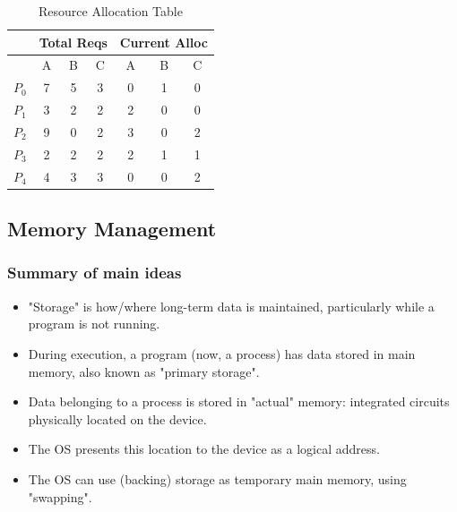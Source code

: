 \documentclass[a4paper, 10pt]{article}
\begin{document}
\begin{table}[h!]
    \centering
    \begin{tabular}{c|ccc|ccc}
        \hline
        \multicolumn{1}{c}{} & \multicolumn{3}{c|}{\textbf{Total Reqs}} & \multicolumn{3}{c}{\textbf{Current Alloc}}                 \\
        \hline
                             & A                                        & B                                          & C & A & B & C \\
        \hline
        $P_0$                & 7                                        & 5                                          & 3 & 0 & 1 & 0 \\
        $P_1$                & 3                                        & 2                                          & 2 & 2 & 0 & 0 \\
        $P_2$                & 9                                        & 0                                          & 2 & 3 & 0 & 2 \\
        $P_3$                & 2                                        & 2                                          & 2 & 2 & 1 & 1 \\
        $P_4$                & 4                                        & 3                                          & 3 & 0 & 0 & 2 \\
        \hline
    \end{tabular}
    \caption{Resource Allocation Table}
    \label{tab:resource_allocation}
\end{table}



\subsection{Memory Management}

\subsubsection{Summary of main ideas}
\begin{itemize}
    \item "Storage" is how/where long-term data is maintained, particularly while a program is not running.
    \item During execution, a program (now, a process) has data stored in main memory, also known as "primary storage".
    \item Data belonging to a process is stored in "actual" memory: integrated circuits physically located on the device.
    \item The OS presents this location to the device as a logical address.
    \item The OS can use (backing) storage as temporary main memory, using "swapping".
\end{itemize}
\end{document}

